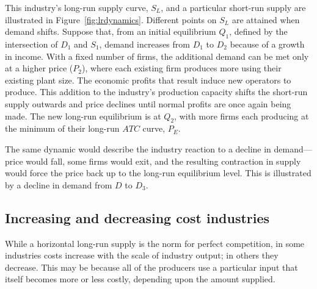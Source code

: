 \newhtmlpage



\newhtmlpage

This industry's long-run supply curve, $S_L$, and a particular short-run
supply are illustrated in Figure~\ref{fig:lrdynamics}. Different points on 
$S_L$ are attained when demand shifts. Suppose that, from an initial
equilibrium $Q_1$, defined by the intersection of $D_1$ and $S_1$, demand
increases from $D_1$ to $D_2$ because of a growth in income. With a fixed
number of firms, the additional demand can be met only at a higher price ($P_2$),
where each existing firm produces more using their existing plant size. The
economic profits that result induce new operators to produce. This addition
to the industry's production capacity shifts the short-run supply outwards
and price declines until normal profits are once again being made. The new
long-run equilibrium is at $Q_2$, with more firms each producing at the
minimum of their long-run $ATC$ curve, $P_E$.

The same dynamic would describe the industry reaction to a decline in
demand---price would fall, some firms would exit, and the resulting
contraction in supply would force the price back up to the long-run
equilibrium level. This is illustrated by a decline in demand from $D$ to 
$D_3$.

\newhtmlpage

\subsection*{Increasing and decreasing cost industries}

While a horizontal long-run supply is the norm for perfect competition, in
some industries costs increase with the scale of industry output; in others
they decrease. This may be because all of the producers use a particular
input that itself becomes more or less costly, depending upon the amount
supplied.



\newhtmlpage

